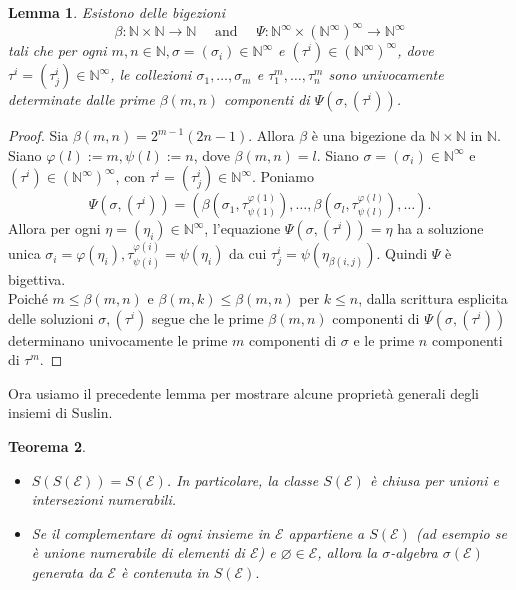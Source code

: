 \documentclass[a4paper, twoside,openright]{article}
\newcommand{\<}{\langle}
\renewcommand{\>}{\rangle}
\newtheorem{teo}{Teorema}[]
\newtheorem{lemma}[teo]{Lemma}
\begin{document}
\begin{lemma}
	Esistono delle bigezioni
	$$	\beta: \mathbb{N} \times \mathbb{N} \rightarrow \mathbb{N} \quad \text { and } \quad \Psi: \mathbb{N}^{\infty} \times\left(\mathbb{N}^{\infty}\right)^{\infty} \rightarrow \mathbb{N}^{\infty}
	$$
	tali che per ogni $m, n \in \mathbb{N}, \sigma=\left(\sigma_{i}\right) \in \mathbb{N}^{\infty}$ e $\left(\tau^{i}\right) \in\left(\mathbb{N}^{\infty}\right)^{\infty}$, dove $\tau^{i}=\left(\tau_{j}^{i}\right) \in \mathbb{N}^{\infty}$, le collezioni $\sigma_{1}, \ldots, \sigma_{m}$ e $\tau_{1}^{m}, \ldots, \tau_{n}^{m}$ sono univocamente determinate dalle prime $\beta(m, n)$ componenti di $\Psi\left(\sigma,\left(\tau^{i}\right)\right)$.
\end{lemma}	

\begin{proof}
	Sia $\beta(m, n)=2^{m-1}(2 n-1)$. Allora $\beta$ è una bigezione da $\mathbb{N} \times \mathbb{N}$ in $\mathbb{N}$. Siano $\varphi(l):=m, \psi(l):=n$, dove $\beta(m, n)=l$. Siano $\sigma=\left(\sigma_{i}\right) \in \mathbb{N}^{\infty}$ e $\left(\tau^{i}\right) \in\left(\mathbb{N}^{\infty}\right)^{\infty}$, con $\tau^{i}=\left(\tau_{j}^{i}\right) \in \mathbb{N}^{\infty}$. Poniamo
	$$
	\Psi\left(\sigma,\left(\tau^{i}\right)\right)=\left(\beta\left(\sigma_{1}, \tau_{\psi(1)}^{\varphi(1)}\right), \ldots, \beta\left(\sigma_{l}, \tau_{\psi(l)}^{\varphi(l)}\right), \ldots\right) .
	$$
	Allora per ogni $\eta=\left(\eta_{i}\right) \in \mathbb{N}^{\infty}$, l'equazione $\Psi\left(\sigma,\left(\tau^{i}\right)\right)=\eta$ ha a soluzione unica $\sigma_{i}=\varphi\left(\eta_{i}\right),  \tau_{\psi(i)}^{\varphi(i)}=\psi(\eta_i)$ da cui $\tau_{j}^{i}=\psi\left(\eta_{\beta(i, j)}\right)$. Quindi $\Psi$ è bigettiva.\\
	Poiché $m \leq \beta(m, n)$ e $\beta(m, k) \leq \beta(m, n)$ per $k \leq n$, dalla scrittura esplicita delle soluzioni $\sigma, (\tau^i)$ segue che le prime $\beta(m, n)$ componenti di $\Psi\left(\sigma,\left(\tau^{i}\right)\right)$ determinano univocamente le prime $m$ componenti di $\sigma$ e le prime $n$ componenti di $\tau^{m}$.
	
\end{proof}

Ora usiamo il precedente lemma per mostrare alcune proprietà generali degli insiemi di Suslin.\\

\begin{teo} \label{SE}
	\hfill
	\begin{itemize}
		\item $S(S(\mathcal{E}))=S(\mathcal{E})$. In particolare, la classe $S(\mathcal{E})$ è chiusa per unioni e intersezioni numerabili.
		\item Se il complementare di ogni insieme in $\mathcal{E}$ appartiene a $S(\mathcal{E})$ (ad esempio se è unione numerabile di elementi di $\mathcal{E}$) e $\varnothing \in \mathcal{E}$, allora la $\sigma$-algebra $\sigma(\mathcal{E})$ generata da $\mathcal{E}$ è contenuta in $S(\mathcal{E}).$
	\end{itemize}
\end{teo}
\end{document}
